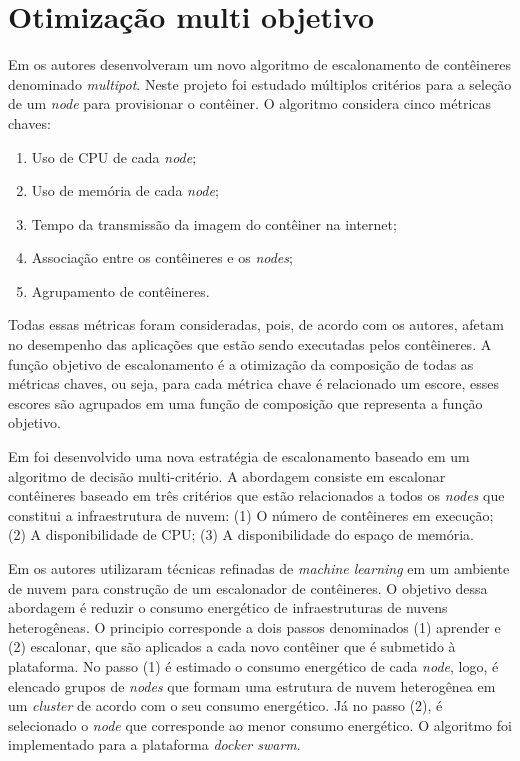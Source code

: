 \section{Otimização multi objetivo}
Em  os autores desenvolveram um novo algoritmo de escalonamento de contêineres denominado \textit{multipot}. Neste projeto foi estudado múltiplos critérios para a seleção de um \textit{node} para provisionar o contêiner. O algoritmo considera cinco métricas chaves:
\begin{enumerate}
	\item Uso de CPU de cada \textit{node};
	\item Uso de memória de cada \textit{node};
	\item Tempo da transmissão da imagem do contêiner na internet;
	\item Associação entre os contêineres e os \textit{nodes};
	\item Agrupamento de contêineres.
\end{enumerate}
Todas essas métricas foram consideradas, pois, de acordo com os autores, afetam no desempenho das aplicações que estão sendo executadas pelos contêineres. A função objetivo de escalonamento é a otimização da composição de todas as métricas chaves, ou seja, para cada métrica chave é relacionado um escore, esses escores são agrupados em uma função de composição que representa a função objetivo.

Em  foi desenvolvido uma nova estratégia de escalonamento baseado em um algoritmo de decisão multi-critério. A abordagem consiste em escalonar contêineres baseado em três critérios que estão relacionados a todos os \textit{nodes}  que constitui a infraestrutura de nuvem: (1) O número de contêineres em execução; (2) A disponibilidade de CPU; (3) A disponibilidade do espaço de memória.

Em  os autores utilizaram técnicas refinadas de \textit{machine learning} em um ambiente de nuvem para construção de um escalonador de contêineres. O objetivo dessa abordagem é reduzir o consumo energético de infraestruturas de nuvens heterogêneas. O principio corresponde a dois passos denominados (1) aprender e (2) escalonar, que são aplicados a cada novo contêiner que é submetido à plataforma. No passo (1) é estimado o consumo energético de cada \textit{node}, logo, é elencado grupos de \textit{nodes} que formam uma estrutura de nuvem heterogênea em um \textit{cluster} de acordo com o seu consumo energético.
Já no passo (2), é selecionado o \textit{node} que corresponde  ao menor consumo energético. O algoritmo foi implementado para a plataforma \textit{docker swarm}.

